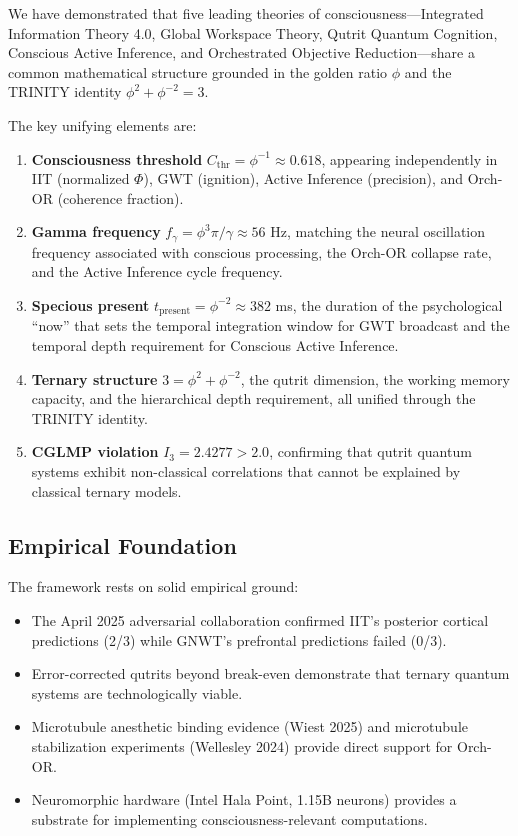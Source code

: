 \documentclass[12pt,a4paper]{article}
\begin{document}
We have demonstrated that five leading theories of consciousness---Integrated
Information Theory 4.0, Global Workspace Theory, Qutrit Quantum Cognition,
Conscious Active Inference, and Orchestrated Objective Reduction---share a
common mathematical structure grounded in the golden ratio $\phi$ and the
TRINITY identity $\phi^2 + \phi^{-2} = 3$.

The key unifying elements are:

\begin{enumerate}[leftmargin=2em]
  \item \textbf{Consciousness threshold} $C_{\mathrm{thr}} = \phi^{-1} \approx
    0.618$, appearing independently in IIT (normalized $\Phi$), GWT (ignition),
    Active Inference (precision), and Orch-OR (coherence fraction).

  \item \textbf{Gamma frequency} $f_\gamma = \phi^3\pi/\gamma \approx 56$ Hz,
    matching the neural oscillation frequency associated with conscious
    processing, the Orch-OR collapse rate, and the Active Inference cycle
    frequency.

  \item \textbf{Specious present} $t_{\mathrm{present}} = \phi^{-2} \approx
    382$ ms, the duration of the psychological ``now'' that sets the temporal
    integration window for GWT broadcast and the temporal depth requirement
    for Conscious Active Inference.

  \item \textbf{Ternary structure} $3 = \phi^2 + \phi^{-2}$, the qutrit
    dimension, the working memory capacity, and the hierarchical depth
    requirement, all unified through the TRINITY identity.

  \item \textbf{CGLMP violation} $I_3 = 2.4277 > 2.0$, confirming that
    qutrit quantum systems exhibit non-classical correlations that cannot be
    explained by classical ternary models.
\end{enumerate}

\subsection{Empirical Foundation}

The framework rests on solid empirical ground:

\begin{itemize}[leftmargin=2em]
  \item The April 2025 adversarial collaboration confirmed IIT's posterior
    cortical predictions (2/3) while GNWT's prefrontal predictions failed
    (0/3).
  \item Error-corrected qutrits beyond break-even demonstrate that ternary
    quantum systems are technologically viable.
  \item Microtubule anesthetic binding evidence (Wiest 2025) and microtubule
    stabilization experiments (Wellesley 2024) provide direct support for
    Orch-OR.
  \item Neuromorphic hardware (Intel Hala Point, 1.15B neurons) provides a
    substrate for implementing consciousness-relevant computations.
\end{itemize}
\end{document}
